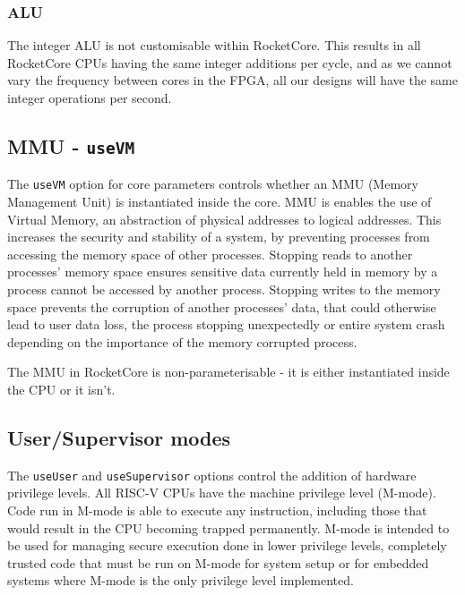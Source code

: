 \subsubsection{ALU}
The integer ALU is not customisable within RocketCore. This results in all RocketCore CPUs having the same integer additions per cycle, and as we cannot vary the frequency between cores in the FPGA, all our designs will have the same integer operations per second.

\subsubsection{}

\subsection{MMU - \texttt{useVM}}
The \texttt{useVM} option for core parameters controls whether an MMU (Memory Management Unit) is instantiated inside the core. MMU is enables the use of Virtual Memory, an abstraction of physical addresses to logical addresses. This increases the security and stability of a system, by preventing processes from accessing the memory space of other processes. Stopping reads to another processes' memory space ensures sensitive data currently held in memory by a process cannot be accessed by another process. Stopping writes to the memory space prevents the corruption of another processes' data, that could otherwise lead to user data loss, the process stopping unexpectedly or entire system crash depending on the importance of the memory corrupted process.

The MMU in RocketCore is non-parameterisable - it is either instantiated inside the CPU or it isn't. %

\subsection{User/Supervisor modes}
The \texttt{useUser} and \texttt{useSupervisor} options control the addition of hardware privilege levels. All RISC-V CPUs have the machine privilege level (M-mode). Code run in M-mode is able to execute any instruction, including those that would result in the CPU becoming trapped permanently. M-mode is intended to be used for managing secure execution done in lower privilege levels, completely trusted code that must be run on M-mode for system setup or for embedded systems where M-mode is the only privilege level implemented.

